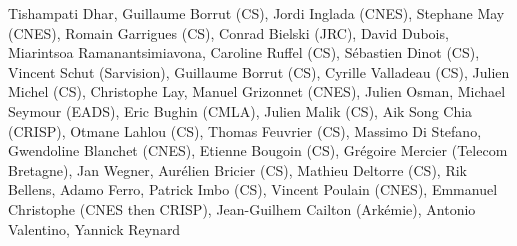 Tishampati Dhar, Guillaume Borrut (CS), Jordi Inglada (CNES), Stephane May (CNES), Romain Garrigues (CS), Conrad Bielski (JRC), David Dubois, Miarintsoa Ramanantsimiavona, Caroline Ruffel (CS), S\'ebastien Dinot (CS), Vincent Schut (Sarvision), Guillaume Borrut (CS), Cyrille Valladeau (CS), Julien Michel (CS), Christophe Lay, Manuel Grizonnet (CNES), Julien Osman, Michael Seymour (EADS), Eric Bughin (CMLA), Julien Malik (CS), Aik Song Chia (CRISP), Otmane Lahlou (CS), Thomas Feuvrier (CS), Massimo Di Stefano, Gwendoline Blanchet (CNES), Etienne Bougoin (CS), Gr\'egoire Mercier (Telecom Bretagne), Jan Wegner, Aur\'elien Bricier (CS), Mathieu Deltorre (CS), Rik Bellens, Adamo Ferro, Patrick Imbo (CS), Vincent Poulain (CNES), Emmanuel Christophe (CNES then CRISP), Jean-Guilhem Cailton (Ark\'emie), Antonio Valentino, Yannick Reynard